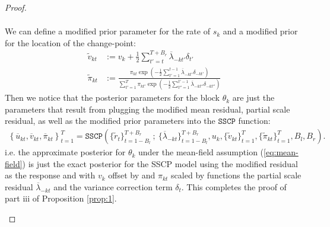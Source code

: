 \begin{proof}
\begin{enumerate}[label=\roman*.]
\begin{align*}
\end{align*}
We can define a modified prior parameter for the rate of $s_{k}$ and a modified prior for the location of the change-point:
\begin{align*}
    \tilde{v}_{kt} &:= v_k + \frac{1}{2}\sum_{t'=t}^{T+B_r}\overline{\lambda}_{-kt'}\delta_{t'} \\
    \tilde{\pi}_{kt} &:= \frac{\pi_{kt} \exp\left(-\frac{1}{2}\sum_{t'=1}^{t-1}\overline{\lambda}_{-kt'}\delta_{-kt'}\right)}{\sum_{t'=1}^T \pi_{kt'} \exp\left(-\frac{1}{2}\sum_{t''=1}^{t'-1}\overline{\lambda}_{-kt''}\delta_{-kt''}\right)} 
\end{align*}
Then we notice that the posterior parameters for the block $\theta_k$ are just the parameters that result from plugging the modified mean residual, partial scale residual, as well as the modified prior parameters into the $\texttt{SSCP}$ function:
\small
\begin{align*}
    \left\{\overline{u}_{kt}, \overline{v}_{kt}, \overline{\pi}_{kt}\right\}_{t=1}^T = \texttt{SSCP}\left(\{\tilde{r}_{t}\}_{t=1-B_l}^{T+B_r} \:;\:\{\overline{\lambda}_{-kt}\}_{t=1-B_l}^{T+B_r}, u_k, \{\tilde{v}_{kt}\}_{t=1}^T, \{\tilde{\pi}_{kt}\}_{t=1}^T, B_l,B_r\right).
\end{align*}
\normalsize
i.e. the approximate posterior for $\theta_{k}$ under the mean-field assumption (\ref{eq:mean-field}) is just the exact posterior for the SSCP model using the modified residual as the response and with $v_k$ offset by and $\pi_{kt}$ scaled by functions the partial scale residual $\overline{\lambda}_{-kt}$ and the variance correction term $\delta_{t}$. This completes the proof of part iii of Proposition \ref{prop:1}.

\end{enumerate}
\end{proof}